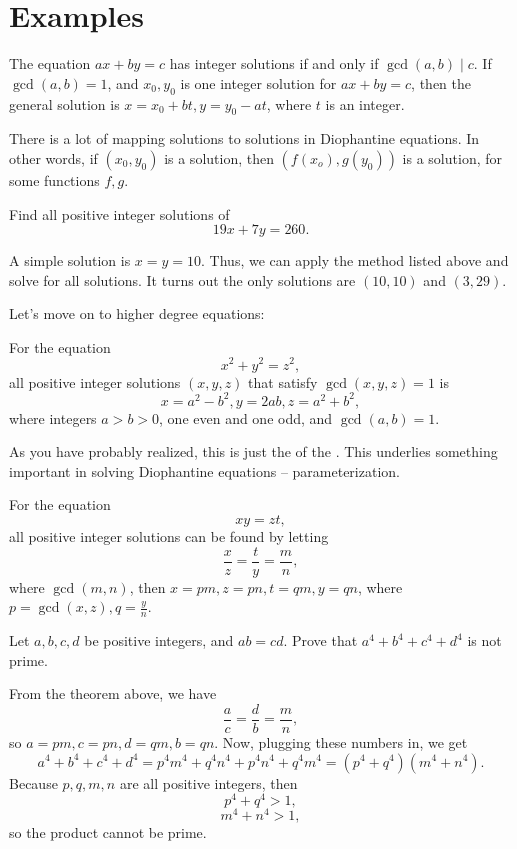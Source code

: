 \documentclass{article}
\begin{document}
\section{Examples}
\begin{theo} 
The equation $ax+by=c$ has integer solutions if and only if $\gcd(a,b) \mid c$. If $\gcd(a,b) = 1$, and $x_0,y_0$ is one integer solution for $ax+by=c$, then the general solution is $x=x_0+bt,y=y_0-at$, where $t$ is an integer.
\end{theo}
There is a lot of mapping solutions to solutions in Diophantine equations. In other words, if $(x_0,y_0)$ is a solution, then $(f(x_o),g(y_0))$ is a solution, for some functions $f,g$.
\begin{exam}
Find all positive integer solutions of
$$19x+7y=260.$$
\end{exam}
\begin{sol}
A simple solution is $x=y=10$. Thus, we can apply the method listed above and solve for all solutions. It turns out the only solutions are $(10,10)$ and $(3,29)$. 
\end{sol}
Let's move on to higher degree equations:
\begin{theo} 
For the equation
$$x^2+y^2=z^2,$$
all positive integer solutions $(x,y,z)$ that satisfy $\gcd(x,y,z)=1$ is 
$$x=a^2-b^2,y=2ab,z=a^2+b^2,$$
where integers $a>b>0$, one even and one odd, and $\gcd(a,b)=1$.
\end{theo}
As you have probably realized, this is just the  of the . This underlies something important in solving Diophantine equations -- parameterization. 
\begin{theo} 
For the equation
$$xy=zt,$$
all positive integer solutions can be found by letting
$$\frac{x}{z} = \frac{t}{y} = \frac{m}{n},$$
where $\gcd(m,n)$, then $x=pm,z=pn,t=qm,y=qn$, where $p=\gcd(x,z),q=\frac{y}{n}$. 
\end{theo}
\begin{exam}
Let $a,b,c,d$ be positive integers, and $ab=cd$. Prove that $a^4+b^4+c^4+d^4$ is not prime.
\end{exam}
\begin{sol}
From the theorem above, we have
$$\frac{a}{c} = \frac{d}{b} = \frac{m}{n},$$
so $a=pm,c=pn,d=qm,b=qn$. Now, plugging these numbers in, we get
$$a^4+b^4+c^4+d^4 = p^4m^4 + q^4n^4 + p^4n^4 + q^4m^4 = (p^4 + q^4)(m^4+n^4).$$
Because $p,q,m,n$ are all positive integers, then 
$$p^4+q^4>1,$$
$$m^4+n^4>1,$$
so the product cannot be prime.
\end{sol}
\end{document}
